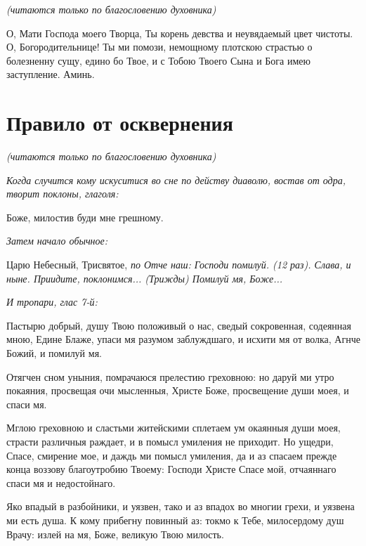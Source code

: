 \itshape (читаются только по благословению духовника)

\normalfont{}


О, Мати Господа моего Творца, Ты корень девства и неувядаемый цвет чистоты. О, Богородительнице! Ты ми помози, немощному плотскою страстью о болезненну сущу, едино бо Твое, и с Тобою Твоего Сына и Бога имею заступление. Аминь.





\section{Правило от осквернения}
 


\itshape (читаются только по благословению духовника)\normalfont{}


\itshape Когда случится кому искуситися во сне по действу диаволю, востав от одра, творит поклоны, глаголя: 

\normalfont{}

Боже, милостив буди мне грешному.


\itshape Затем начало обычное: 

\normalfont{}Царю Небесный, Трисвятое, \itshape по\normalfont{} Отче наш: Господи помилуй. (12 раз). Слава, и ныне. Приидите, поклонимся... (\itshape Трижды\normalfont{}) Помилуй мя, Боже...


\itshape И тропари, глас 7-й: \normalfont{}

Пастырю добрый, душу Твою положивый о нас, сведый сокровенная, содеянная мною, Едине Блаже, упаси мя разумом заблуждшаго, и исхити мя от волка, Агнче Божий, и помилуй мя. 


Отягчен сном уныния, помрачаюся прелестию греховною: но даруй ми утро покаяния, просвещая очи мысленныя, Христе Боже, просвещение души моея, и спаси мя. 


Мглою греховною и сластьми житейскими сплетаем ум окаянныя души моея, страсти различныя раждает, и в помысл умиления не приходит. Но ущедри, Спасе, смирение мое, и даждь ми помысл умиления, да и аз спасаем прежде конца воззову благоутробию Твоему: Господи Христе Спасе мой, отчаяннаго спаси мя и недостойнаго. 


Яко впадый в разбойники, и уязвен, тако и аз впадох во многии грехи, и уязвена ми есть душа. К кому прибегну повинный аз: токмо к Тебе, милосердому душ Врачу: излей на мя, Боже, великую Твою милость. 


